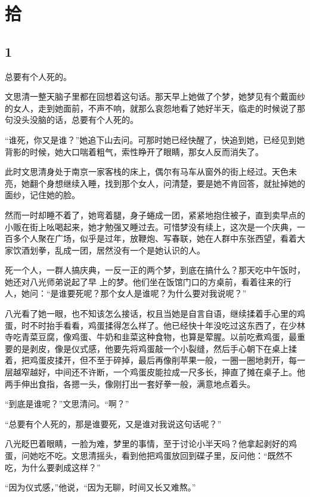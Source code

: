 \section{拾}

{\centering\subsection{1}}

总要有个人死的。

文思清一整天脑子里都在回想着这句话。那天早上她做了个梦，她梦见有个戴面纱的女人，走到她面前，不声不响，就那么哀怨地看了她好半天，临走的时候说了那句没头没脑的话，总要有个人死的。

“谁死，你又是谁？”她追下山去问。可那时她已经快醒了，快追到她，已经见到她背影的时候，她大口喘着粗气，索性睁开了眼睛，那女人反而消失了。

此时文思清身处于南京一家客栈的床上，偶尔有马车从窗外的街上经过。天色未亮，她翻个身想继续入睡，找到那个女人，问清楚，要是她不肯回答，就扯掉她的面纱，记住她的脸。

然而一时却睡不着了，她弯着腿，身子蜷成一团，紧紧地抱住被子，直到卖早点的小贩在街上吆喝起来，她才勉强又睡过去。可惜梦没有续上，这次是一个庆典，一百多个人聚在广场，似乎是过年，放鞭炮、写春联，她在人群中东张西望，看着大家饮酒划拳，乱成一团，居然没有一个是她认识的人。

死一个人，一群人搞庆典，一反一正的两个梦，到底在搞什么？那天吃中午饭时，她还对八光师弟说起了早
上的梦。他们坐在饭馆门口的方桌前，看着往来的行人，她问：“是谁要死呢？那个女人是谁呢？为什么要对我说呢？”

八光看了她一眼，也不知该怎么接话，权且当她是自言自语，继续揉着手心里的鸡蛋，时不时抬手看看，鸡蛋揉得怎么样了。他已经快十年没吃过这东西了，在少林寺吃青菜豆腐，像鸡蛋、牛奶和韭菜这种食物，也算是荤腥。以前吃煮鸡蛋，最重要的是剥皮，像是仪式感，他要先将鸡蛋敲一个小裂缝，然后手心朝下在桌上揉着，把鸡蛋皮揉开，但不至于碎掉，最后再像削苹果一般，一圈一圈地剥开，每一层越窄越好，中间还不许断，一个鸡蛋皮能拉成一尺多长，抻直了摊在桌子上。他两手伸出食指，各摁一头，像刚打出一套好拳一般，满意地点着头。

“到底是谁呢？”文思清问。“啊？”

“总要有个人死的，那是谁要死，又是谁对我说这句话呢？”

八光眨巴着眼睛，一脸为难，梦里的事情，至于讨论小半天吗？他拿起剥好的鸡蛋，问她吃不吃。文思清摇头，看到他把鸡蛋放回到碟子里，反问他：“既然不吃，为什么要剥成这样？”

“因为仪式感，”他说，“因为无聊，时间又长又难熬。”

